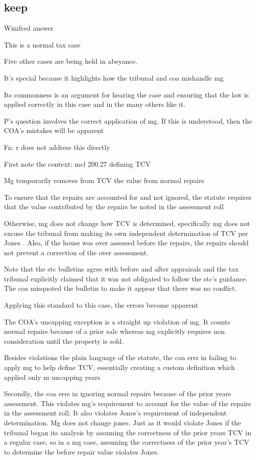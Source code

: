 
\subsection{keep}
Winifred answer

This is a normal tax case

Five other cases are being held in abeyance.

It’s special because it highlights how the tribunal and coa mishandle mg

Its commonness is an argument for hearing the case and ensuring that the law is applied correctly in this case and in the many others like it.

P’s question involves the correct application of mg. If this is understood, then the COA’s mistakes will be apparent

Fn: r does not address this directly

First note the context: mcl 200.27 defining TCV

Mg temporarily removes from TCV the value from normal repairs

To ensure that the repairs are accounted for and not ignored, the statute requires that the value contributed by the repairs be noted in the assessment roll

Otherwise, mg does not change how TCV is determined, specifically mg does not excuse the tribunal from making its own independent determination of TCV per Jones . Also, if the house was over assessed before the repairs, the repairs should not prevent a correction of the over assessment.

Note that the stc bulletins agree with before and after appraisals and the tax tribunal explicitly claimed that it was not obligated to follow the stc’s guidance. The coa misquoted the bulletin to make it appear that there was no conflict.

Applying this standard to this case, the errors become apparent

The COA’s uncapping exception is a straight up violation of mg. It counts normal repairs because of a prior sale whereas mg explicitly requires non consideration until the property is sold.

Besides violations the plain language of the statute, the coa errs in failing to apply mg to help define TCV, essentially creating a custom definition which applied only m uncapping years

Secondly, the coa errs in ignoring normal repairs because of the prior years assessment. This violates mg’s requirement to account for the value of the repairs in the assessment roll. It also violates Jones’s requirement of independent determination. Mg does not change jones. Just as it would violate Jones if the tribunal began its analysis by assuming the correctness of the prior years TCV in a regular case, so in a mg case, assuming the correctness of the prior year’s TCV to determine the before repair value violates Jones.

